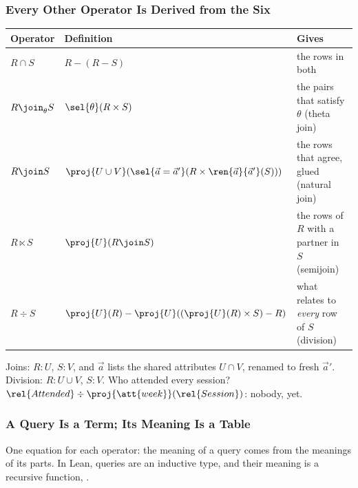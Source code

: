 \documentclass{ltx-talk}
\begin{document}
\begin{frame}
  \frametitle{Every Other Operator Is Derived from the Six}
  {\centering\renewcommand{}
    {\headerrow\begin{tabular}{@{}l@{\quad}l@{\quad}l@{}}
      \hline
      \textbf{Operator} & \textbf{Definition} & \textbf{Gives} \\ \hline
      $R \cap S$ & $R - (R - S)$ & the rows in both \\
      $R \join_{\theta} S$ & $\sel{\theta}(R \times S)$ & the pairs that
        satisfy $\theta$ (theta join) \\
      $R \join S$ & $\proj{U \cup V}(\sel{\vec{a} = \vec{a}'}(R \times
        \ren{\vec{a}}{\vec{a}'}(S)))$ & the rows that agree, glued
        (natural join) \\
      $R \ltimes S$ & $\proj{U}(R \join S)$ & the rows of $R$ with a
        partner in $S$ (semijoin) \\
      $R \div S$ & $\proj{U}(R) - \proj{U}((\proj{U}(R) \times S) - R)$ &
        what relates to \emph{every} row of $S$ (division) \\ \hline
    \end{tabular}}\par}
  \medskip
  Joins: $R : U$, $S : V$, and $\vec{a}$ lists the shared attributes
  $U \cap V$, renamed to fresh $\vec{a}'$. Division: $R : U \cup V$,
  $S : V$. Who attended every session?
  $\rel{Attended} \div \proj{\att{week}}(\rel{Session})$: nobody, yet.
\end{frame}

\begin{frame}
  \frametitle{A Query Is a Term; Its Meaning Is a Table}
  One equation for each operator: the meaning of a query comes from the
  meanings of its parts. In Lean, queries are an inductive type, and their
  meaning is a recursive function, \code{eval}.
\end{frame}
\end{document}
